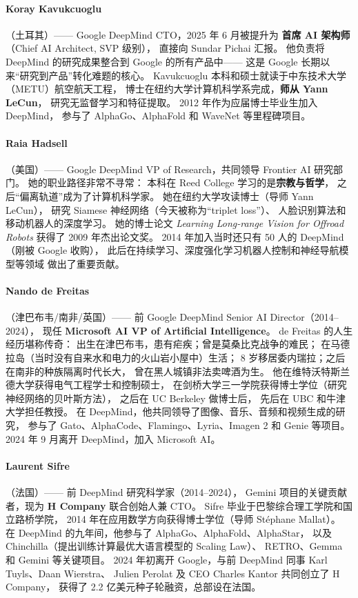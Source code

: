 \paragraph{Koray Kavukcuoglu}（土耳其）——
Google DeepMind CTO，2025 年 6 月被提升为
\textbf{首席 AI 架构师}（Chief AI Architect, SVP 级别），
直接向 Sundar Pichai 汇报。
他负责将 DeepMind 的研究成果整合到 Google 的所有产品中——
这是 Google 长期以来``研究到产品''转化难题的核心。
Kavukcuoglu 本科和硕士就读于中东技术大学（METU）航空航天工程，
博士在纽约大学计算机科学系完成，\textbf{师从 Yann LeCun}，
研究无监督学习和特征提取。
2012 年作为应届博士毕业生加入 DeepMind，
参与了 AlphaGo、AlphaFold 和 WaveNet 等里程碑项目。

\paragraph{Raia Hadsell}（美国）——
Google DeepMind VP of Research，共同领导 Frontier AI 研究部门。
她的职业路径非常不寻常：
本科在 Reed College 学习的是\textbf{宗教与哲学}，
之后``偏离轨道''成为了计算机科学家。
她在纽约大学攻读博士（导师 Yann LeCun），
研究 Siamese 神经网络（今天被称为``triplet loss''）、
人脸识别算法和移动机器人的深度学习。
她的博士论文 \textit{Learning Long-range Vision for Offroad Robots}
获得了 2009 年杰出论文奖。
2014 年加入当时还只有 50 人的 DeepMind（刚被 Google 收购），
此后在持续学习、深度强化学习机器人控制和神经导航模型等领域
做出了重要贡献。

\paragraph{Nando de Freitas}（津巴布韦/南非/英国）——
前 Google DeepMind Senior AI Director（2014--2024），
现任 \textbf{Microsoft AI VP of Artificial Intelligence}。
de Freitas 的人生经历堪称传奇：
出生在津巴布韦，患有疟疾；曾是莫桑比克战争的难民；
在马德拉岛（当时没有自来水和电力的火山岩小屋中）生活；
8 岁移居委内瑞拉；之后在南非的种族隔离时代长大，
曾在黑人城镇非法卖啤酒为生。
他在维特沃特斯兰德大学获得电气工程学士和控制硕士，
在剑桥大学三一学院获得博士学位（研究神经网络的贝叶斯方法），
之后在 UC Berkeley 做博士后，
先后在 UBC 和牛津大学担任教授。
在 DeepMind，他共同领导了图像、音乐、音频和视频生成的研究，
参与了 Gato、AlphaCode、Flamingo、Lyria、Imagen 2 和 Genie 等项目。
2024 年 9 月离开 DeepMind，加入 Microsoft AI。

\paragraph{Laurent Sifre}（法国）——
前 DeepMind 研究科学家（2014--2024），
Gemini 项目的关键贡献者，现为 \textbf{H Company} 联合创始人兼 CTO。
Sifre 毕业于巴黎综合理工学院和国立路桥学院，
2014 年在应用数学方向获得博士学位（导师 Stéphane Mallat）。
在 DeepMind 的九年间，他参与了 AlphaGo、AlphaFold、AlphaStar，
以及 Chinchilla（提出训练计算最优大语言模型的 Scaling Law）、
RETRO、Gemma 和 Gemini 等关键项目。
2024 年初离开 Google，与前 DeepMind 同事 Karl Tuyls、Daan Wierstra、
Julien Perolat 及 CEO Charles Kantor 共同创立了 H Company，
获得了 2.2 亿美元种子轮融资，总部设在法国。

